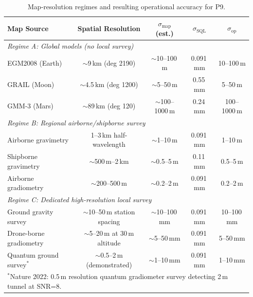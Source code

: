 \documentclass[11pt]{article}
\theoremstyle{definition}
\theoremstyle{remark}
\newcommand{\SQL}{\mathrm{SQL}}
\begin{document}
\begin{table}[H]
\centering
\caption{Map-resolution regimes and resulting operational accuracy for P9.}
\label{tab:map-regimes}
\begin{tabular}{@{}p{3.8cm}cccc@{}}
\toprule
Map Source & Spatial Resolution & $\sigma_{\mathrm{map}}$ (est.) &
  $\sigma_{\SQL}$ & $\sigma_{\mathrm{op}}$ \\
\midrule
\multicolumn{5}{l}{\textit{Regime A: Global models (no local survey)}} \\
EGM2008 (Earth) & $\sim$9\,km (deg 2190) & $\sim$10--100\,m & 0.091\,mm & 10--100\,m \\
GRAIL (Moon) & $\sim$4.5\,km (deg 1200) & $\sim$5--50\,m & 0.55\,mm & 5--50\,m \\
GMM-3 (Mars) & $\sim$89\,km (deg 120) & $\sim$100--1000\,m & 0.24\,mm & 100--1000\,m \\
\midrule
\multicolumn{5}{l}{\textit{Regime B: Regional airborne/shipborne survey}} \\
Airborne gravimetry & 1--3\,km half-wavelength & $\sim$1--10\,m & 0.091\,mm & 1--10\,m \\
Shipborne gravimetry & $\sim$500\,m--2\,km & $\sim$0.5--5\,m & 0.11\,mm & 0.5--5\,m \\
Airborne gradiometry & $\sim$200--500\,m & $\sim$0.2--2\,m & 0.091\,mm & 0.2--2\,m \\
\midrule
\multicolumn{5}{l}{\textit{Regime C: Dedicated high-resolution local survey}} \\
Ground gravity survey & $\sim$10--50\,m station spacing & $\sim$10--100\,mm & 0.091\,mm & 10--100\,mm \\
Drone-borne gradiometry & $\sim$5--20\,m at 30\,m altitude & $\sim$5--50\,mm & 0.091\,mm & 5--50\,mm \\
Quantum ground survey$^*$ & $\sim$0.5--2\,m (demonstrated) & $\sim$1--10\,mm & 0.091\,mm & 1--10\,mm \\
\bottomrule
\multicolumn{5}{l}{\small $^*$Nature 2022: 0.5\,m resolution quantum gradiometer survey detecting 2\,m tunnel at SNR=8.}
\end{tabular}
\end{table}
\end{document}
